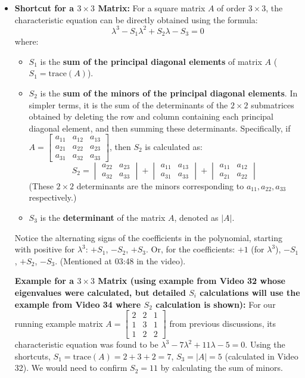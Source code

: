\documentclass{article}
\begin{document}
\begin{itemize}
    \item \textbf{Shortcut for a $3 \times 3$ Matrix:}
    For a square matrix $A$ of order $3 \times 3$, the characteristic equation can be directly obtained using the formula:
    \[ \lambda^3 - S_1 \lambda^2 + S_2 \lambda - S_3 = 0 \]
    where:
    \begin{itemize}
        \item $S_1$ is the \textbf{sum of the principal diagonal elements} of matrix $A$ ($S_1 = \text{trace}(A)$).
        \item $S_2$ is the \textbf{sum of the minors of the principal diagonal elements}. In simpler terms, it is the sum of the determinants of the $2 \times 2$ submatrices obtained by deleting the row and column containing each principal diagonal element, and then summing these determinants.
         Specifically, if $A = \begin{bmatrix} a_{11} & a_{12} & a_{13} \\ a_{21} & a_{22} & a_{23} \\ a_{31} & a_{32} & a_{33} \end{bmatrix}$, then $S_2$ is calculated as:
         \[ S_2 = \begin{vmatrix} a_{22} & a_{23} \\ a_{32} & a_{33} \end{vmatrix} + \begin{vmatrix} a_{11} & a_{13} \\ a_{31} & a_{33} \end{vmatrix} + \begin{vmatrix} a_{11} & a_{12} \\ a_{21} & a_{22} \end{vmatrix} \]
         (These $2 \times 2$ determinants are the minors corresponding to $a_{11}, a_{22}, a_{33}$ respectively.)
        \item $S_3$ is the \textbf{determinant} of the matrix $A$, denoted as $|A|$.
    \end{itemize}
    Notice the alternating signs of the coefficients in the polynomial, starting with positive for $\lambda^3$: $+S_1$, $-S_2$, $+S_3$. Or, for the coefficients: $+1$ (for $\lambda^3$), $-S_1$, $+S_2$, $-S_3$. (Mentioned at 03:48 in the video).

    \textbf{Example for a $3 \times 3$ Matrix (using example from Video 32 whose eigenvalues were calculated, but detailed $S_i$ calculations will use the example from Video 34 where $S_2$ calculation is shown):}
    For our running example matrix $A = \begin{bmatrix} 2 & 2 & 1 \\ 1 & 3 & 1 \\ 1 & 2 & 2 \end{bmatrix}$ from previous discussions, its characteristic equation was found to be $\lambda^3 - 7\lambda^2 + 11\lambda - 5 = 0$. Using the shortcuts, $S_1 = \text{trace}(A) = 2+3+2 = 7$, $S_3 = |A| = 5$ (calculated in Video 32). We would need to confirm $S_2=11$ by calculating the sum of minors.


\end{itemize}
\end{document}
